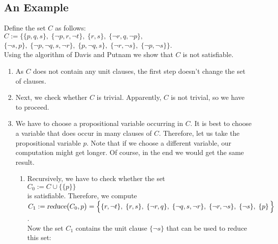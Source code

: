 \subsection{An Example}
Define the set  $C$ as follows: \\[0.2cm]
\hspace*{1.3cm} $C := \Big\{ \{p, q, s\},\; \{\neg p, r, \neg t\},\;  \{r, s\},\; \{\neg r, q, \neg p\},$ \\
\hspace*{2.5cm} $\{\neg s, p\},\; \{\neg p, \neg q, s, \neg r\},\; \{p, \neg q, s\},\;
\{\neg r, \neg s\},\; \{\neg p, \neg s\} \Big\}  $. 
\\[0.2cm]
Using the algorithm of  Davis and Putnam we show that  $C$             is not satisfiable.
\begin{enumerate}
\item As $C$ does not contain any unit clauses, the first step doesn't change the set of clauses.
\item Next, we check whether $C$ is trivial.
      Apparently,  $C$ is not trivial, so we have to proceed.
\item We have to choose a propositional variable occurring in $C$.  It is best to choose a variable that
      does occur in many clauses of $C$.  Therefore, let us take the propositional
      variable $p$.  Note that if we choose a different variable, our computation might get
      longer. Of course, in the end we would get the same result.
      \begin{enumerate}
      \item Recursively, we have to check whether the set 
            \\[0.2cm]
            \hspace*{1.3cm}
            $C_0 := C \cup \bigl\{ \{p\} \bigr\}$       
            \\[0.2cm]
            is satisfiable.  Therefore, we compute \\[0.2cm]
            \hspace*{0.3cm} 
            $C_1 := \textsl{reduce}\bigl(C_0,p\bigr) = 
                    \Big\{ \{r, \neg t\},\; \{r, s\},\; \{\neg r, q\},\; \{\neg q, s, \neg r\},\; 
                    \{\neg r, \neg s\},\; \{ \neg s\},\;\{p\}\, 
                    \Big\}$.
            \\[0.2cm]
            Now the set  $C_1$ contains the unit clause $\{\neg s\}$
            that can be used to reduce this set: \\[0.2cm]
            \hspace*{1.3cm} 

\end{enumerate}
\end{enumerate}
